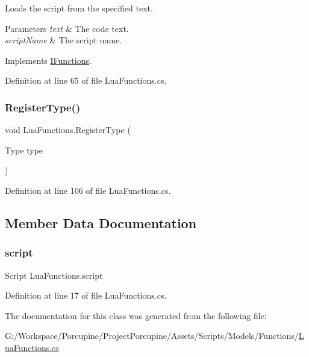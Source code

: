 Loads the script from the specified text. 


\begin{DoxyParams}{Parameters}
{\em text} & The code text.\\
\hline
{\em script\+Name} & The script name.\\
\hline
\end{DoxyParams}


Implements \hyperlink{interface_i_functions_acdee59b5855ab9e87fcf11e3cdf9c967}{I\+Functions}.



Definition at line 65 of file Lua\+Functions.\+cs.

\mbox{\label{class_lua_functions_ab3693345e8576e3f1cb5874531b10626}} 
\subsubsection{\texorpdfstring{Register\+Type()}{RegisterType()}}
{\footnotesize\ttfamily void Lua\+Functions.\+Register\+Type (\begin{DoxyParamCaption}\item[{Type}]{type }\end{DoxyParamCaption})}



Definition at line 106 of file Lua\+Functions.\+cs.



\subsection{Member Data Documentation}
\mbox{\label{class_lua_functions_a4a3ad64c9593f35238cc445645f68771}} 
\subsubsection{\texorpdfstring{script}{script}}
{\footnotesize\ttfamily Script Lua\+Functions.\+script\hspace{0.3cm}{\ttfamily [protected]}}



Definition at line 17 of file Lua\+Functions.\+cs.



The documentation for this class was generated from the following file\+:\begin{DoxyCompactItemize}
\item 
G\+:/\+Workspace/\+Porcupine/\+Project\+Porcupine/\+Assets/\+Scripts/\+Models/\+Functions/\hyperlink{_lua_functions_8cs}{Lua\+Functions.\+cs}\end{DoxyCompactItemize}
